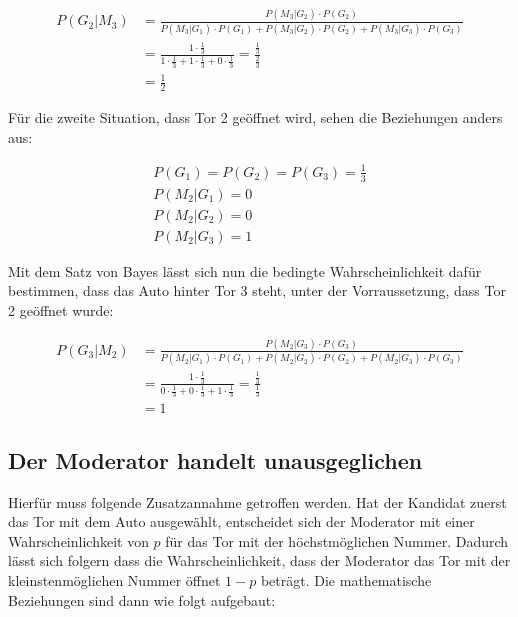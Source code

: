 \begin{equation}
    \begin{split}
        P(G_2 | M_3) & = \frac{P(M_3 | G_2) \cdot P(G_2)}{P(M_3 | G_1) \cdot P(G_1) +
            P(M_3 | G_2) \cdot P(G_2) + P(M_3 | G_3) \cdot P(G_3)} \\
        & = \frac{1 \cdot \frac{1}{3}}{1 \cdot \frac{1}{3} + 1 \cdot \frac{1}{3} + 0 \cdot \frac{1}{3}} = \frac{\frac{1}{3}}{\frac{2}{3}} \\
        & = \frac{1}{2}
    \end{split}
\end{equation}

Für die zweite Situation, dass Tor 2 geöffnet wird, sehen die Beziehungen anders aus:

\begin{equation}
    \begin{split}
        P(G_1) = P(G_2) = P(G_3) = \frac{1}{3} \\
        P(M_2 | G_1) = 0 \\
        P(M_2 | G_2) = 0 \\
        P(M_2 | G_3) = 1
    \end{split}
\end{equation}

Mit dem Satz von Bayes lässt sich nun die bedingte Wahrscheinlichkeit dafür bestimmen, dass das Auto hinter Tor 3 steht, unter der Vorraussetzung, dass Tor 2 geöffnet wurde:

\begin{equation}
    \begin{split}
        P(G_3 | M_2)& = \frac{P(M_2 | G_3) \cdot P(G_3)}{P(M_2 | G_1) \cdot P(G_1) + P(M_2 | G_2) \cdot P(G_2) + P(M_2 | G_3) \cdot P(G_3)} \\
        & = \frac{1 \cdot \frac{1}{3}}{0 \cdot \frac{1}{3} + 0 \cdot \frac{1}{3} + 1 \cdot \frac{1}{3}} = \frac{\frac{1}{3}}{\frac{1}{3}} \\
        & = 1
    \end{split}
\end{equation}


\subsection{Der Moderator handelt unausgeglichen}

Hierfür muss folgende Zusatzannahme getroffen werden. Hat der Kandidat zuerst das Tor mit dem Auto ausgewählt, entscheidet sich der Moderator mit einer Wahrscheinlichkeit von $p$
für das Tor mit der höchstmöglichen Nummer. Dadurch lässt sich folgern dass die Wahrscheinlichkeit, dass der Moderator das Tor mit der kleinstenmöglichen Nummer öffnet $1 - p$ beträgt.
Die mathematische Beziehungen sind dann wie folgt aufgebaut:

